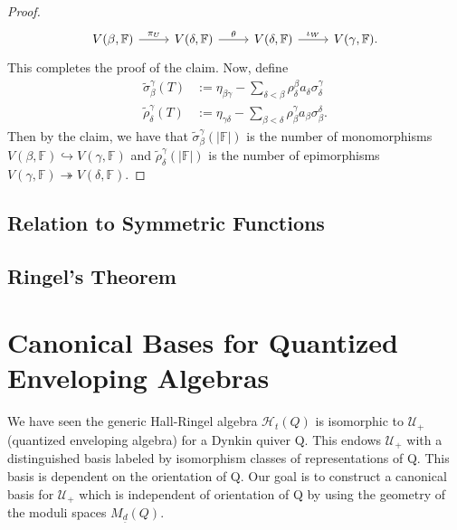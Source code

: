 \documentclass{book}
\begin{document}
\begin{proof}
        \[\begin{tikzcd}
            V(\beta,\mathbb{F})\arrow{r}{\pi_U}& V(\delta,\mathbb{F}) \arrow{r}{\theta} & V(\delta,\mathbb{F}) \arrow{r}{\iota_W} &V(\gamma,\mathbb{F}).
        \end{tikzcd}\]
        This completes the proof of the claim. Now, define \begin{align*}
            \tilde{\sigma}_\beta^\gamma (T) &:= \eta_{\beta\gamma}-\sum_{\delta<\beta} \rho_\delta^\beta a_\delta \sigma_\delta^\gamma\\ \tilde{\rho}_\delta^\gamma (T) &:= \eta_{\gamma\delta}-\sum_{\beta<\delta} \rho_\beta^\gamma a_\beta \sigma_\beta^\delta.
        \end{align*}
        Then by the claim, we have that $\tilde{\sigma}_\beta^\gamma (|\mathbb{F}|)$ is the number of monomorphisms $V(\beta,\mathbb{F})\hookrightarrow V(\gamma,\mathbb{F})$ and $\tilde{\rho}_\delta^\gamma (|\mathbb{F}|)$ is the number of epimorphisms $V(\gamma,\mathbb{F})\twoheadrightarrow V(\delta,\mathbb{F})$.
    \end{proof}


  \section{Relation to Symmetric Functions}

  \section{Ringel's Theorem}


\chapter{Canonical Bases for Quantized Enveloping Algebras}
  We have seen the generic Hall-Ringel algebra $\mathcal{H}_t(Q)$ is isomorphic to $\mathcal{U}_+$ (quantized enveloping algebra) for a Dynkin quiver Q. This endows $\mathcal{U}_+$ with a distinguished basis labeled by isomorphism classes of representations of Q. This basis is dependent on the orientation of Q. Our goal is to construct a canonical basis for $\mathcal{U}_+$ which is independent of orientation of Q by using the geometry of the moduli spaces $M_{\underline{d}}(Q)$. 
\end{document}

